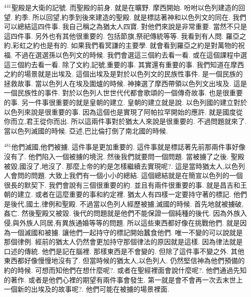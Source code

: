 \documentclass{book}
\begin{document}
$^{441}$聖殿是大衛的記號.
而聖殿的前身.
就是在曠野.
摩西開始.
吩咐以色列建造的回望.
約季.
所以回望,約季到後來建造的聖殿.
就是標誌著神和以色列文的同在.
我們可以總結這四件事.
我自己稱之為猶太人四寶.
對他們來說是非常重要.
當然不只是這四件事.
另外也有其他很重要的.
包括節旗,祭祀傳統等等.
我看到有人問.
羅亞之約,彩虹之約也是有的.
如果我們看冥謙的主要學.
就會看到羅亞之約是對萬物的祝福.
不過在選選孫以色列文的時候.
我們會選這三個約去看一看.
或在這個課程中選這三個約去看一看.
除了文約,記號,重要的事.
其實還有重要的事.
我們知道在摩西之約的場景就是出埃及.
這個出埃及是對於以色列文的民族性事件.
是一個民族的拯救故事.
當以色列人在埃及圍爐的時候.
神揀選了摩西帶領以色列文出埃及.
這是一個民族性的事件.
對於以色列人世世代代都會歌頌的一個傳奇故事.
也是很重要的事.
另一件事很重要的就是皇朝的建立.
皇朝的建立就是說.
以色列國的建立對於以色列來說是很重要的事.
因為這個也是實現了阿帕拉罕開始的應許.
就是國度從你而立,君王從你而出.
所以這兩件事對於猶太人來說是很重要的.
不過問題就來了.
當以色列滅國的時候.
亞述,巴比倫打倒了南北國的時候.

$^{481}$他們滅國,他們被擄.
這件事是更加重要的.
這件事就是標誌著先前那兩件事好像沒有了.
他們陷入一個被擄的境況.
然後我們就要問一個問題.
當被擄了之後.
聖殿被毀,國沒了,地沒了.
那麼上帝的約是怎樣繼續去實現呢?.
這是當時猶太人,以色列人會問的問題.
大致上我們有一個小小的總結.
這個總結就是在簡宣以色列的一個很長的默契下.
我們會說有三個很重要的約.
並且有兩件很重要的事.
就是昌吉和王朝的建立.
或者在這麼重要的事和約定裡.
猶太人有四樣一定要持守著的標記.
他們是後代,國土,律例和聖殿.
不過當以色列人經歷被擄,滅國的時候.
首先地就被擄破,姦亡.
然後聖殿又被毀.
後代的問題就是他們不能保證一個純種的後代.
因為外族入侵,與外族人同居,有異族通婚等等的問題.
所以這些東西都好像在挑戰他們.
就是因為一個滅國和被擄.
讓他們一起持守的標記開始蠶食他們.
唯一不變的可以說就是那個律例.
經前的猶太人仍然會更加持守那個律法的原因就是這樣.
因為律法就是口述的傳統.
他們是記在腦裡.
那樣東西是不會變的.
但除了這件事不變之外.
其他東西都好像慢慢地沒有了.
但當時候的猶太人,以色列人.
仍然堅信神為他們預備的約的時候.
可想而知他們在想什麼呢?.
或者在聖經裡面會說什麼呢?.
他們通過先知的著作.
或者是他們心裡的期望有兩件事會發生.
第一就是會不會再一次去末世上一個新的出埃及的故事呢?.
他們可能在被擄的場景裡面.
\end{document}
